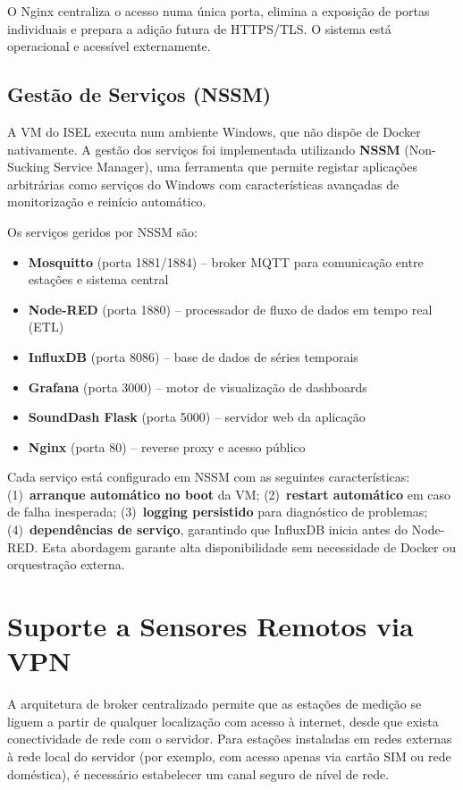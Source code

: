 \documentclass[12pt,a4paper]{report}
\begin{document}
O Nginx centraliza o acesso numa única porta, elimina a exposição de portas individuais e prepara a adição futura de HTTPS/TLS. O sistema está operacional e acessível externamente.

\subsection{Gestão de Serviços (NSSM)}

A VM do ISEL executa num ambiente Windows, que não dispõe de Docker nativamente. A gestão dos serviços foi implementada utilizando \textbf{NSSM} (Non-Sucking Service Manager), uma ferramenta que permite registar aplicações arbitrárias como serviços do Windows com características avançadas de monitorização e reinício automático.

Os serviços geridos por NSSM são:

\begin{itemize}[nosep]
  \item \textbf{Mosquitto} (porta 1881/1884) -- broker MQTT para comunicação entre estações e sistema central
  \item \textbf{Node-RED} (porta 1880) -- processador de fluxo de dados em tempo real (ETL)
  \item \textbf{InfluxDB} (porta 8086) -- base de dados de séries temporais
  \item \textbf{Grafana} (porta 3000) -- motor de visualização de dashboards
  \item \textbf{SoundDash Flask} (porta 5000) -- servidor web da aplicação
  \item \textbf{Nginx} (porta 80) -- reverse proxy e acesso público
\end{itemize}

Cada serviço está configurado em NSSM com as seguintes características: (1)~\textbf{arranque automático no boot} da VM; (2)~\textbf{restart automático} em caso de falha inesperada; (3)~\textbf{logging persistido} para diagnóstico de problemas; (4)~\textbf{dependências de serviço}, garantindo que InfluxDB inicia antes do Node-RED. Esta abordagem garante alta disponibilidade sem necessidade de Docker ou orquestração externa.

\section{Suporte a Sensores Remotos via VPN}
\label{sec:tailscale}

A arquitetura de broker centralizado permite que as estações de medição se liguem a partir de qualquer localização com acesso à internet, desde que exista conectividade de rede com o servidor. Para estações instaladas em redes externas à rede local do servidor (por exemplo, com acesso apenas via cartão SIM ou rede doméstica), é necessário estabelecer um canal seguro de nível de rede.
\end{document}
